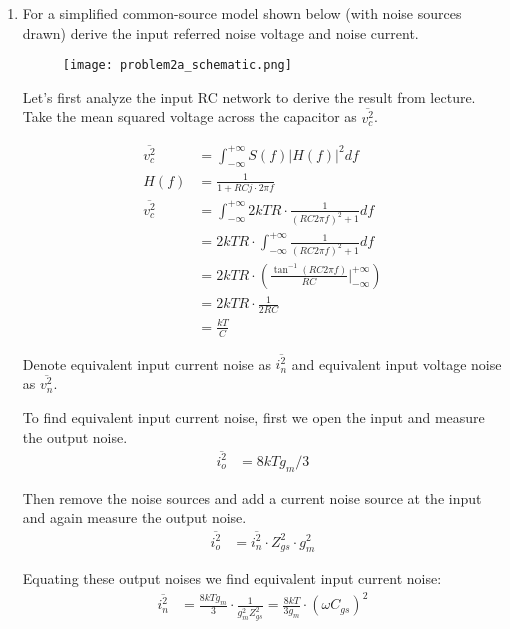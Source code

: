 \begin{enumerate}[label=(\alph*)]
    \item {\color{blue} For a simplified common-source model shown below (with noise sources drawn) derive the input referred noise voltage and noise current.}
    \begin{figure}[H]
        \centering \texttt{[image: problem2a\_schematic.png]}
    \end{figure}

    Let's first analyze the input RC network to derive the result from lecture. Take the mean squared voltage across the capacitor as $\overline{v_c^2}$.

    \begin{align*}
        \overline{v_c^2} &= \int_{- \infty}^{+ \infty} S(f) |H(f)|^2 df \\
        H(f) &= \frac{1}{1 + RC j \cdot 2 \pi f} \\
        \overline{v_c^2} &= \int^{+\infty}_{-\infty} 2kTR \cdot \frac{1}{(RC 2 \pi f)^2 + 1} df \\
        &= 2kTR \cdot \int^{+\infty}_{-\infty} \frac{1}{(RC 2 \pi f)^2 + 1} df \\
        &= 2kTR \cdot (\frac{\tan^{-1}(RC 2 \pi f)}{RC} \rvert_{- \infty}^{+ \infty}) \\
        &= 2kTR \cdot \frac{1}{2 RC} \\
        &= \frac{kT}{C}
    \end{align*}

    Denote equivalent input current noise as $\overline{i_{n}^2}$ and equivalent input voltage noise as $\overline{v_n^2}$.

    To find equivalent input current noise, first we open the input and measure the output noise.
    \begin{align*}
        \overline{i_{o}^2} &= 8kT g_m / 3
    \end{align*}

    Then remove the noise sources and add a current noise source at the input and again measure the output noise.
    \begin{align*}
        \overline{i_{o}^2} &= \overline{i_n^2} \cdot Z_{gs}^2 \cdot g_m^2
    \end{align*}

    Equating these output noises we find equivalent input current noise:
    \begin{align*}
        \overline{i_n^2} &= \frac{8kT g_m}{3} \cdot \frac{1}{g_m^2 Z_{gs}^2} = \frac{8kT}{3 g_m} \cdot (\omega C_{gs})^2
    \end{align*}


\end{enumerate}
